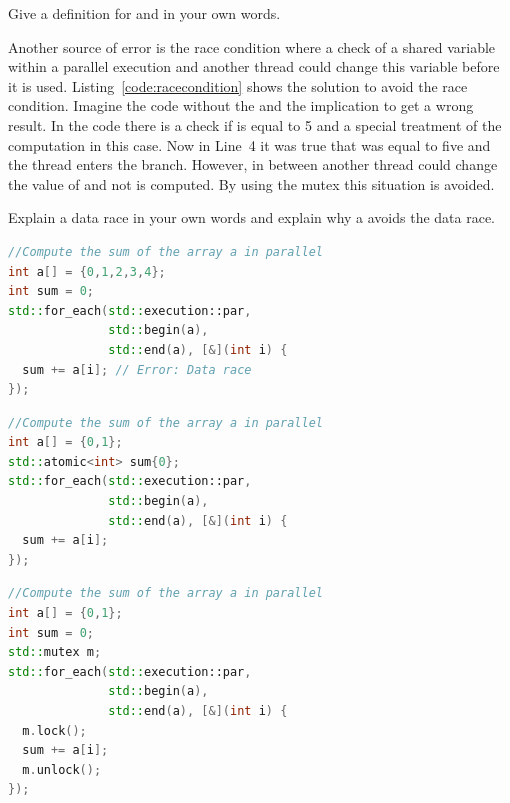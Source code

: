 \documentclass[11pt,fleqn]{book} %
\begin{document}
\begin{exercise}
Give a definition for  and  in your own words. 
\end{exercise}

Another source of error is the race condition where a check of a shared variable within a parallel execution and another thread could change this variable before it is used. Listing~\ref{code:racecondition} shows the solution to avoid the race condition.  Imagine the code without the  and the implication to get a wrong result. In the code there is a check if  is equal to 5 and a special treatment of the computation in this case. Now in Line~4 it was true that  was equal to five and the thread enters the  branch. However, in between another thread could change the value of  and not  is computed. By using the mutex this situation is avoided.

\begin{exercise}
Explain a data race in your own words and explain why a  avoids the data race.
\end{exercise}

\begin{lstlisting}[language=c++,caption={Example code and Solution for a data race.\label{code:data:race}},float,floatplacement=tb]
//Compute the sum of the array a in parallel
int a[] = {0,1,2,3,4};
int sum = 0;
std::for_each(std::execution::par, 
              std::begin(a), 
              std::end(a), [&](int i) {
  sum += a[i]; // Error: Data race
});
\end{lstlisting}


\begin{lstlisting}[language=c++,caption={Solution to avoid the data race using \cpp{std::atomic}.\label{code:datarace:atomic}},float,floatplacement=tb]
//Compute the sum of the array a in parallel
int a[] = {0,1};
std::atomic<int> sum{0};
std::for_each(std::execution::par, 
              std::begin(a), 
              std::end(a), [&](int i) {
  sum += a[i]; 
});
\end{lstlisting}

\begin{lstlisting}[language=c++,caption={Solution to avoid the data race using \cpp{std::mutex}.\label{code:datarace:mutex}},float,floatplacement=tb]
//Compute the sum of the array a in parallel
int a[] = {0,1};
int sum = 0;
std::mutex m;
std::for_each(std::execution::par, 
              std::begin(a), 
              std::end(a), [&](int i) {
  m.lock();
  sum += a[i];
  m.unlock(); 
});
\end{lstlisting}
\end{document}
